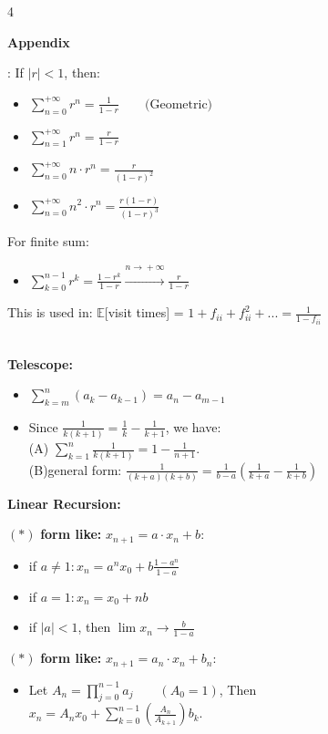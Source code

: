 \documentclass[a4paper, landscape]{article}
\newcommand{\topic}[1]{\par\medskip\textbf{#1}\par}
\newcommand{\subtopic}[1]{\par\textbf{#1}}
\renewcommand{\topic}[1]{\par\medskip\noindent\colorbox{highlightcolor}{\parbox{\dimexpr\columnwidth-2\fboxsep\relax}{\textbf{#1}}}\par}
\renewcommand{\subtopic}[1]{\par\textbf{\color{blue}{#1}}} %
\begin{document}
\begin{multicols}{4}
\vspace{10cm}
\topic{Appendix}
\subtopic{Sequence Convergence}: If $|r|<1$, then:\\ 
\begin{itemize}
    \item $\sum_{n=0}^{+\infty}r^n=\frac{1}{1-r} \qquad \text{(Geometric)}$
    \item $\sum_{n=1}^{+\infty}r^n=\frac{r}{1-r}$
    \item $\sum_{n=0}^{+\infty}n \cdot r^n=\frac{r}{(1-r)^2}$
    \item $\sum_{n=0}^{+\infty}n^2 \cdot r^n=\frac{r(1-r)}{(1-r)^3}$
\end{itemize}
For finite sum:
\begin{itemize}
    \item $\sum_{k=0}^{n-1}r^k=\frac{1-r^k}{1-r}\xrightarrow{n\xrightarrow[]{}+\infty}\frac{r}{1-r}$
\end{itemize}
This is used in: $\mathbb E$[visit times] = $1+f_{ii}+f_{ii}^2+...=\frac{1}{1-f_{ii}}$

\subtopic{Recursion:}\\
\textbf{Telescope:}\\
\begin{itemize}
    \item $\sum_{k=m}^{n}(a_k-a_{k-1})=a_n-a_{m-1}$
    \item Since $\frac{1}{k(k+1)}=\frac{1}{k}-\frac{1}{k+1}$, we have:\\
    (A) $\sum_{k=1}^{n}\frac{1}{k(k+1)}=1-\frac{1}{n+1}$.\\
    (B)general form: $\frac{1}{(k+a)(k+b)}=\frac{1}{b-a}(\frac{1}{k+a}-\frac{1}{k+b})$
\end{itemize}

\textbf{Linear Recursion:}\\
\par $(*)$ \textbf{form like:}  $x_{n+1}=a\cdot x_n+b$:
\begin{itemize}
    \item if $a\neq1:x_n=a^nx_0+b\frac{1-a^n}{1-a}$
    \item if $a=1:x_n=x_0+nb$
    \item if $|a|<1$, then $\lim x_n \xrightarrow{}\frac{b}{1-a}$
\end{itemize}

\par $(*)$ \textbf{form like:}  $x_{n+1}=a_n\cdot x_n+b_n$:\\
\begin{itemize}
    \item Let $A_n=\prod_{j=0}^{n-1} a_j \qquad (A_0=1)$, Then\\ $x_n = A_n x_0 + \sum_{k=0}^{n-1}\left(\frac{A_n}{A_{k+1}}\right)b_k $.
\end{itemize}



\end{multicols}
\end{document}
